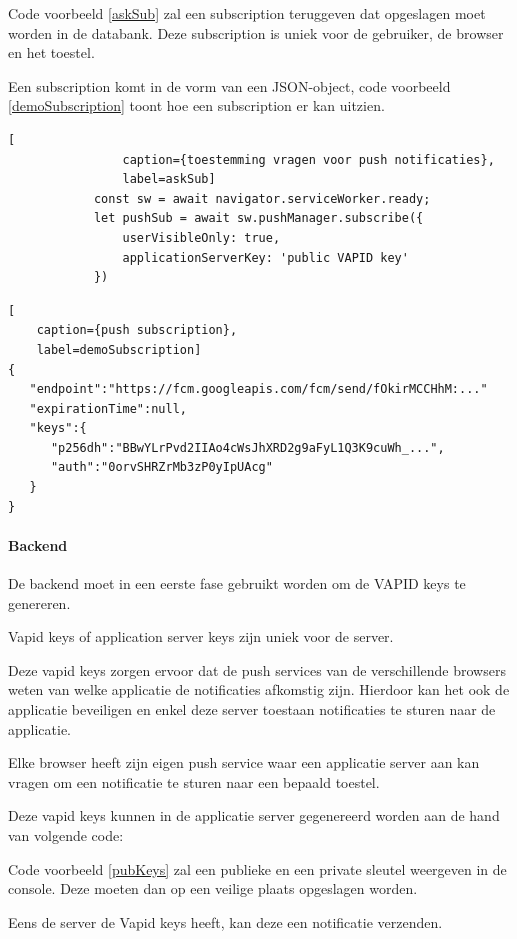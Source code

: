 			Code voorbeeld \ref{askSub} zal een subscription teruggeven dat opgeslagen moet worden in de databank. Deze subscription is uniek voor de gebruiker, de browser en het toestel.
			\autocite{Gaunt2019a}
			
			Een subscription komt in de vorm van een JSON-object, code voorbeeld \ref{demoSubscription} toont hoe een subscription er kan uitzien.
			
			\begin{lstlisting}[
				caption={toestemming vragen voor push notificaties},
				label=askSub]
			const sw = await navigator.serviceWorker.ready;
			let pushSub = await sw.pushManager.subscribe({
				userVisibleOnly: true,
			 	applicationServerKey: 'public VAPID key'
			})
			\end{lstlisting}
	
\begin{lstlisting}[
	caption={push subscription},
	label=demoSubscription]
{
   "endpoint":"https://fcm.googleapis.com/fcm/send/fOkirMCCHhM:..."
   "expirationTime":null,
   "keys":{
      "p256dh":"BBwYLrPvd2IIAo4cWsJhXRD2g9aFyL1Q3K9cuWh_...",
      "auth":"0orvSHRZrMb3zP0yIpUAcg"
   }
}
\end{lstlisting}


		\paragraph{Backend}
			De backend moet in een eerste fase gebruikt worden om de VAPID keys te genereren.
			
			Vapid keys of application server keys zijn uniek voor de server.
			
			Deze vapid keys zorgen ervoor dat de push services van de verschillende browsers weten van welke applicatie de notificaties afkomstig zijn. Hierdoor kan het ook de applicatie beveiligen en enkel deze server toestaan notificaties te sturen naar de applicatie.
			
			Elke browser heeft zijn eigen push service waar een applicatie server aan kan vragen om een notificatie te sturen naar een bepaald toestel.
			\autocite{Gaunt2020}
			
			Deze vapid keys kunnen in de applicatie server gegenereerd worden aan de hand van volgende code:
			
			Code voorbeeld \ref{pubKeys} zal een publieke en een private sleutel weergeven in de console. Deze moeten dan op een veilige plaats opgeslagen worden.
			
			Eens de server de Vapid keys heeft, kan deze een notificatie verzenden.
			
